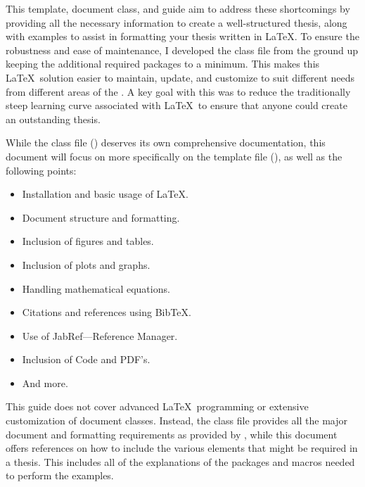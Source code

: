 		This template, document class, and guide aim to address these shortcomings by providing all the necessary information to create a well-structured thesis, along with examples to assist in formatting your thesis written in \LaTeX.
		To ensure the robustness and ease of maintenance, I developed the class file from the ground up keeping the additional required packages to a minimum.
		This makes this \LaTeX\ solution easier to maintain, update, and customize to suit different needs from different areas of the \University.
		A key goal with this was to reduce the traditionally steep learning curve associated with \LaTeX\ to ensure that anyone could create an outstanding thesis.
		
		While the class file () deserves its own comprehensive documentation, this document will focus on more specifically on the template file (), as well as the following points:
		\begin{itemize}
			\item Installation and basic usage of \LaTeX.
			\item Document structure and formatting.
			\item Inclusion of figures and tables.
			\item Inclusion of plots and graphs.
			\item Handling mathematical equations.
			\item Citations and references using BibTeX.
			\item Use of JabRef---Reference Manager.
			\item Inclusion of Code and PDF's.
			\item And more.
		\end{itemize}

		This guide does not cover advanced \LaTeX\ programming or extensive customization of document classes.
		Instead, the class file  provides all the major document and formatting requirements as provided by \Fac, while this document offers references on how to include the various elements that might be required in a thesis.
		This includes all of the explanations of the packages and macros needed to perform the examples.

